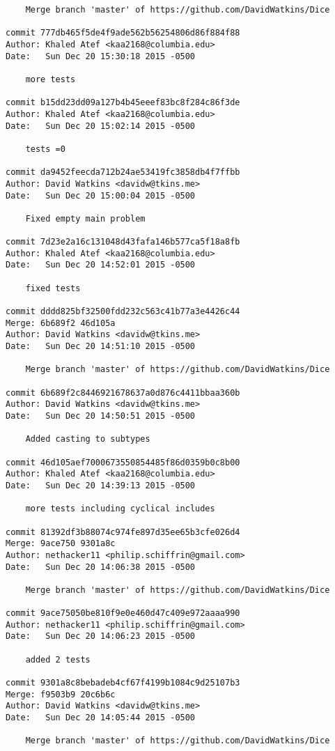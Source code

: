 \begin{verbatim}
    Merge branch 'master' of https://github.com/DavidWatkins/Dice

commit 777db465f5de4f9ade562b56254806d86f884f88
Author: Khaled Atef <kaa2168@columbia.edu>
Date:   Sun Dec 20 15:30:18 2015 -0500

    more tests

commit b15dd23dd09a127b4b45eeef83bc8f284c86f3de
Author: Khaled Atef <kaa2168@columbia.edu>
Date:   Sun Dec 20 15:02:14 2015 -0500

    tests =0

commit da9452feecda712b24ae53419fc3858db4f7ffbb
Author: David Watkins <davidw@tkins.me>
Date:   Sun Dec 20 15:00:04 2015 -0500

    Fixed empty main problem

commit 7d23e2a16c131048d43fafa146b577ca5f18a8fb
Author: Khaled Atef <kaa2168@columbia.edu>
Date:   Sun Dec 20 14:52:01 2015 -0500

    fixed tests

commit dddd825bf32500fdd232c563c41b77a3e4426c44
Merge: 6b689f2 46d105a
Author: David Watkins <davidw@tkins.me>
Date:   Sun Dec 20 14:51:10 2015 -0500

    Merge branch 'master' of https://github.com/DavidWatkins/Dice

commit 6b689f2c8446921678637a0d876c4411bbaa360b
Author: David Watkins <davidw@tkins.me>
Date:   Sun Dec 20 14:50:51 2015 -0500

    Added casting to subtypes

commit 46d105aef7000673550854485f86d0359b0c8b00
Author: Khaled Atef <kaa2168@columbia.edu>
Date:   Sun Dec 20 14:39:13 2015 -0500

    more tests including cyclical includes

commit 81392df3b88074c974fe897d35ee65b3cfe026d4
Merge: 9ace750 9301a8c
Author: nethacker11 <philip.schiffrin@gmail.com>
Date:   Sun Dec 20 14:06:38 2015 -0500

    Merge branch 'master' of https://github.com/DavidWatkins/Dice

commit 9ace75050be810f9e0e460d47c409e972aaaa990
Author: nethacker11 <philip.schiffrin@gmail.com>
Date:   Sun Dec 20 14:06:23 2015 -0500

    added 2 tests

commit 9301a8c8bebadeb4cf67f4199b1084c9d25107b3
Merge: f9503b9 20c6b6c
Author: David Watkins <davidw@tkins.me>
Date:   Sun Dec 20 14:05:44 2015 -0500

    Merge branch 'master' of https://github.com/DavidWatkins/Dice


\end{verbatim}
